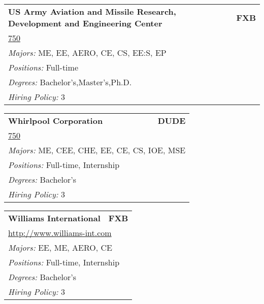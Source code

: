 \documentclass[twoside]{article}
\begin{document}
\begin{center}
\begin{multicols}{3}
\begin{FlushLeft}
\begin{minipage}{\columnwidth}
\end{minipage}
 
\begin{minipage}{\columnwidth}\begin{tabularx}{.95\columnwidth}{Xr}
                 {\Large\bf US Army Aviation and Missile Research, Development and Engineering Center} & {\Large\bf FXB}\\
    \multicolumn{2}{p{.95\columnwidth}}{\url{750}}\\
    \multicolumn{2}{p{.95\columnwidth}}{\emph{Majors:} ME, EE, AERO, CE, CS, EE:S, EP}\\
    \multicolumn{2}{p{.95\columnwidth}}{\emph{Positions:} Full-time}\\
    \multicolumn{2}{p{.95\columnwidth}}{\emph{Degrees:} Bachelor's,Master's,Ph.D.}\\
    \multicolumn{2}{p{.95\columnwidth}}{\emph{Hiring Policy:} 3}\\
    \end{tabularx}
    
\end{minipage}
 
\begin{minipage}{\columnwidth}\begin{tabularx}{.95\columnwidth}{Xr}
                 {\Large\bf Whirlpool Corporation} & {\Large\bf DUDE}\\
    \multicolumn{2}{p{.95\columnwidth}}{\url{750}}\\
    \multicolumn{2}{p{.95\columnwidth}}{\emph{Majors:} ME, CEE, CHE, EE, CE, CS, IOE, MSE}\\
    \multicolumn{2}{p{.95\columnwidth}}{\emph{Positions:} Full-time, Internship}\\
    \multicolumn{2}{p{.95\columnwidth}}{\emph{Degrees:} Bachelor's}\\
    \multicolumn{2}{p{.95\columnwidth}}{\emph{Hiring Policy:} 3}\\
    \end{tabularx}
    
\end{minipage}
 
\begin{minipage}{\columnwidth}\begin{tabularx}{.95\columnwidth}{Xr}
                 {\Large\bf Williams International} & {\Large\bf FXB}\\
    \multicolumn{2}{p{.95\columnwidth}}{\url{http://www.williams-int.com}}\\
    \multicolumn{2}{p{.95\columnwidth}}{\emph{Majors:} EE, ME, AERO, CE}\\
    \multicolumn{2}{p{.95\columnwidth}}{\emph{Positions:} Full-time, Internship}\\
    \multicolumn{2}{p{.95\columnwidth}}{\emph{Degrees:} Bachelor's}\\
    \multicolumn{2}{p{.95\columnwidth}}{\emph{Hiring Policy:} 3}\\
    \end{tabularx}
    

\end{minipage}
\end{FlushLeft}
\end{multicols}
\end{center}
\end{document}

